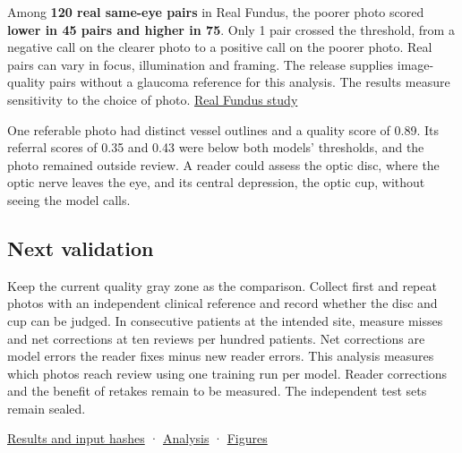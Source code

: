 \documentclass[
  10pt,
]{article}
\begin{document}
Among \textbf{120 real same-eye pairs} in Real Fundus, the poorer photo
scored \textbf{lower in 45 pairs and higher in 75}. Only 1 pair crossed
the threshold, from a negative call on the clearer photo to a positive
call on the poorer photo. Real pairs can vary in focus, illumination and
framing. The release supplies image-quality pairs without a glaucoma
reference for this analysis. The results measure sensitivity to the
choice of photo. \href{https://arxiv.org/abs/2201.00466}{Real Fundus
study}

One referable photo had distinct vessel outlines and a quality score of
0.89. Its referral scores of 0.35 and 0.43 were below both models'
thresholds, and the photo remained outside review. A reader could assess
the optic disc, where the optic nerve leaves the eye, and its central
depression, the optic cup, without seeing the model calls.

\subsection{Next validation}\label{next-validation}

Keep the current quality gray zone as the comparison. Collect first and
repeat photos with an independent clinical reference and record whether
the disc and cup can be judged. In consecutive patients at the intended
site, measure misses and net corrections at ten reviews per hundred
patients. Net corrections are model errors the reader fixes minus new
reader errors. This analysis measures which photos reach review using
one training run per model. Reader corrections and the benefit of
retakes remain to be measured. The independent test sets remain sealed.

\href{review-failures-results.json}{Results and input hashes} ·
\href{../../../tools/analyze_review_failures_20261118.py}{Analysis} ·
\href{../../../tools/plot_review_failures_20261118.py}{Figures}
\end{document}
